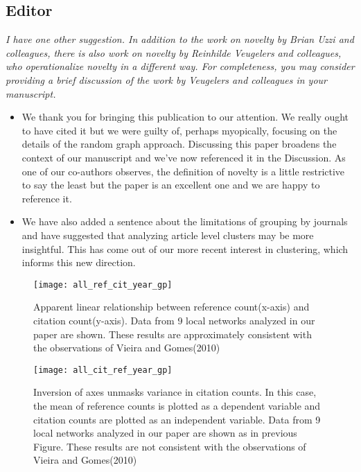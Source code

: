 \documentclass[11pt, oneside]{article}   	%
\begin{document}
\subsection{Editor}
\emph{I have one other suggestion. In addition to the work on novelty by Brian Uzzi and colleagues, there is also work on novelty by Reinhilde Veugelers and colleagues, who operationalize novelty in a different way. For completeness, you may consider providing a brief discussion of the work by Veugelers and colleagues in your manuscript.}
\begin{itemize}
\item We thank you for bringing this publication to our attention. We really ought to have cited it but we were guilty of, perhaps myopically, focusing on the details of the random graph approach. Discussing this paper broadens the context of our manuscript and we've now referenced it in the Discussion. As one of our co-authors observes, the definition of novelty is a little restrictive to say the least but the paper is an excellent one and we are happy to reference it.
\item We have also added a sentence about the limitations of grouping by journals and have suggested that analyzing article level clusters may be more insightful. This has come out of our more recent interest in clustering, which informs this new direction.
 \end{itemize}
 
 \newpage

\begin{figure}[tbhp]
\centering
\texttt{[image: all\_ref\_cit\_year\_gp]}     
\caption{Apparent linear relationship between reference count(x-axis) and citation count(y-axis). Data from 9 local networks analyzed in our paper are shown. These results are approximately consistent with the observations of Vieira and Gomes(2010)} 
\label{fig:refcit}
\end{figure}
\newpage

\begin{figure}[tbhp]
\centering
\texttt{[image: all\_cit\_ref\_year\_gp]}     
\caption{Inversion of axes unmasks variance in citation counts. In this case, the mean of reference counts is plotted as a dependent variable and citation counts are plotted as an independent variable. Data from 9 local networks analyzed in our paper are shown as in previous Figure. These results are not consistent with the observations  of Vieira and Gomes(2010)} 
\label{fig:citref}
\end{figure}
\newpage
\end{document}
